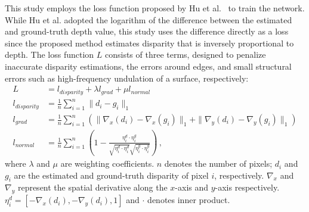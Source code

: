 \documentclass[]{spie}
\newcommand{\mycut}[1]{}
\begin{document}
This study employs the loss function proposed by Hu et al.~\cite{hu2019revisiting} 
to train the network. 
While Hu et al. adopted the logarithm of 
the difference between the estimated and ground-truth depth value,
this study uses the difference directly as a loss 
since the proposed method estimates disparity that is inversely proportional to depth.
The loss function $L$ consists of three terms, 
designed to penalize inaccurate disparity estimations, the errors around edges,
and small structural errors such as high-frequency undulation of a surface,
respectively:
\begin{equation}
  \begin{aligned}
   L &= l_{disparity} + \lambda l_{grad} + \mu l_{normal} \\
   l_{disparity} &= \frac{1}{n} \sum^{n}_{i=1} \|d_{i} - g_{i}\|_{1} \\
   l_{grad} &= \frac{1}{n} \sum^{n}_{i=1}
    \left(
      \|\nabla_{x}(d_{i}) - \nabla_{x}(g_{i})\|_{1} + 
      \|\nabla_{y}(d_{i}) - \nabla_{y}(g_{i})\|_{1}
    \right)\\
   l_{normal} &= \frac{1}{n} \sum^{n}_{i=1}
     \left(
       1 -
       \frac{\eta^d_i \cdot \eta^g_i}
       {\sqrt{\eta^d_i \cdot \eta^d_i} \sqrt{\eta^g_i \cdot \eta^g_i}}
     \right) \, ,
  \end{aligned}
\end{equation}
where $\lambda$ and $\mu$ are weighting coefficients.
$n$ denotes the number of pixels; 
$d_i$ and $g_i$ are the estimated and ground-truth 
disparity of pixel $i$, respectively.
$\nabla_{x}$ and $\nabla_{y}$ represent 
the spatial derivative along the $x$-axis and $y$-axis respectively.
$\eta^d_i = [-\nabla_x (d_i), -\nabla_y (d_i), 1]$ and
$\cdot$ denotes inner product.

\mycut{
The loss function used in this study can be expressed as:
\begin{equation}
   L = l_{disparity} + \lambda l_{grad} + \mu l_{normal}
\end{equation}
where $\lambda$ and $\mu$ are weighting coefficients.
The above loss function $L$ is composed of three terms. 
$l_{disparity}$ is applied to penalize inaccurate 
disparity estimations and is expressed as:
\begin{equation}
   l_{disparity} = \frac{1}{n} \sum^{n}_{i=1} \|d_{i} - g_{i}\|_{1}
\end{equation}
where $n$ is the number of pixels; 
$d_i$ and $g_i$ are the estimated and ground-truth 
disparity of pixel $i$ respectively.
}
\end{document}
